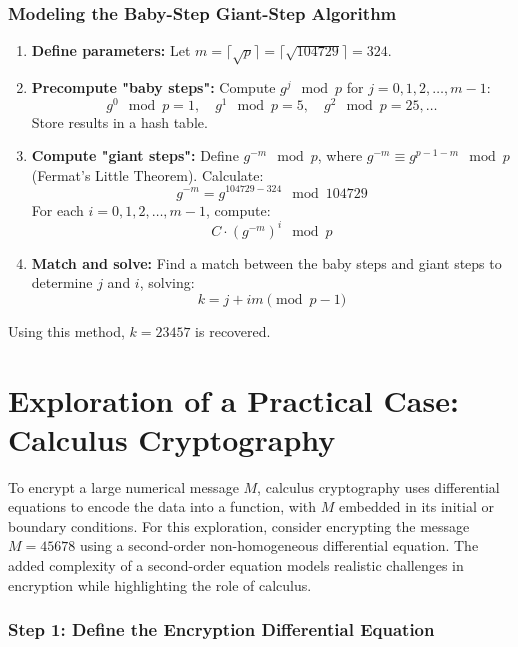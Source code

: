 \documentclass[12pt]{article}
\begin{document}
\subsubsection*{Modeling the Baby-Step Giant-Step Algorithm}
\begin{enumerate}
    \item \textbf{Define parameters:} Let \( m = \lceil \sqrt{p} \rceil = \lceil \sqrt{104729} \rceil = 324 \).

    \item \textbf{Precompute "baby steps":} Compute \( g^j \mod p \) for \( j = 0, 1, 2, \ldots, m - 1 \):
    \[
    g^0 \mod p = 1, \quad g^1 \mod p = 5, \quad g^2 \mod p = 25, \ldots
    \]
    Store results in a hash table.

    \item \textbf{Compute "giant steps":} Define \( g^{-m} \mod p \), where \( g^{-m} \equiv g^{p-1-m} \mod p \) (Fermat's Little Theorem). Calculate:
    \[
    g^{-m} = g^{104729 - 324} \mod 104729
    \]
    For each \( i = 0, 1, 2, \ldots, m - 1 \), compute:
    \[
    C \cdot (g^{-m})^i \mod p
    \]

    \item \textbf{Match and solve:} Find a match between the baby steps and giant steps to determine \( j \) and \( i \), solving:
    \[
    k = j + im \pmod{p-1}
    \]
\end{enumerate}

Using this method, \( k = 23457 \) is recovered.


\section*{Exploration of a Practical Case: Calculus Cryptography}

To encrypt a large numerical message \( M \), calculus cryptography uses differential equations to encode the data into a function, with \( M \) embedded in its initial or boundary conditions. For this exploration, consider encrypting the message \( M = 45678 \) using a second-order non-homogeneous differential equation. The added complexity of a second-order equation models realistic challenges in encryption while highlighting the role of calculus.

\subsubsection*{Step 1: Define the Encryption Differential Equation}
\end{document}
